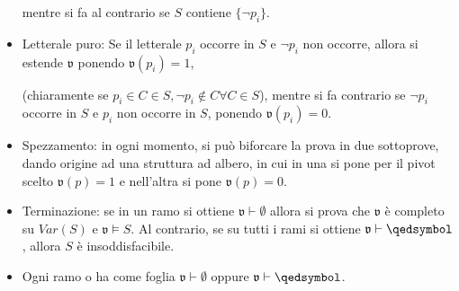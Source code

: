 \begin{itemize}
                mentre si fa al contrario se $S$ contiene $\{\neg p_i\}$.
        \item Letterale puro: Se il letterale $p_i$ occorre in $S$ e $\neg p_i$ non 
                occorre, allora si estende $\mathfrak{v}$ ponendo $\mathfrak{v}(p_i) = 1$, 
                \begin{prooftree}
                \end{prooftree}
                (chiaramente se $p_i \in C \in S, \neg p_i \notin C \forall C \in S$),
                mentre si fa contrario se $\neg p_i$ occorre in $S$ e $p_i$ 
                non occorre in $S$, ponendo $\mathfrak{v}(p_i) = 0$. 
        \item Spezzamento: in ogni momento, si può biforcare la prova in due 
                sottoprove, dando origine ad una struttura ad albero, in cui 
                in una si pone per il pivot scelto $\mathfrak{v}(p) = 1$ 
                e nell'altra si pone $\mathfrak{v}(p)= 0$. 
                \begin{prooftree}
                \end{prooftree}
        \item Terminazione: se in un ramo si ottiene $\mathfrak{v} \vdash \emptyset$ 
                allora si prova che $\mathfrak{v}$ è completo su 
                $Var(S)$ e $\mathfrak{v} \models S$. Al contrario, se su tutti 
                i rami si ottiene $\mathfrak{v} \vdash \qedsymbol$, 
                allora $S$ è insoddisfacibile. 
        \item Ogni ramo o ha come foglia $\mathfrak{v} \vdash \emptyset$ 
                oppure $\mathfrak{v} \vdash \qedsymbol$.
\end{itemize}
